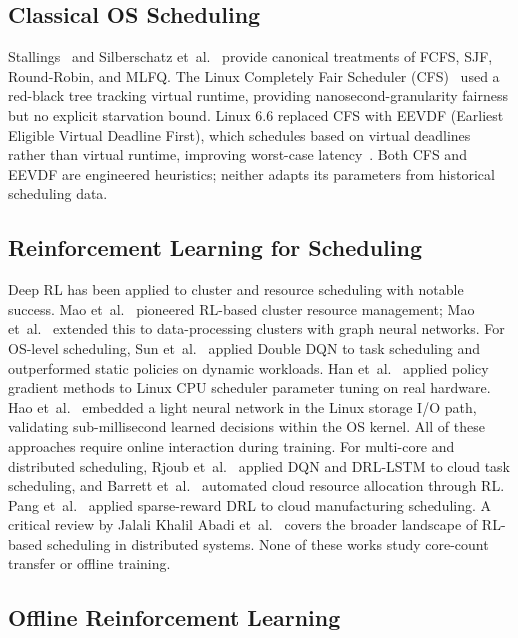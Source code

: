 \documentclass[10pt,journal,compsoc]{IEEEtran}
\begin{document}
\subsection{Classical OS Scheduling}

Stallings~\cite{stallings} and Silberschatz et~al.~\cite{silberschatz}
provide canonical treatments of FCFS, SJF, Round-Robin, and MLFQ.
The Linux Completely Fair Scheduler (CFS)~\cite{silberschatz} used a
red-black tree tracking virtual runtime, providing nanosecond-granularity
fairness but no explicit starvation bound.
Linux 6.6 replaced CFS with EEVDF (Earliest Eligible Virtual Deadline
First), which schedules based on virtual deadlines rather than virtual
runtime, improving worst-case latency~\cite{silberschatz}.
Both CFS and EEVDF are engineered heuristics; neither adapts its
parameters from historical scheduling data.

\subsection{Reinforcement Learning for Scheduling}

Deep RL has been applied to cluster and resource scheduling with notable
success. Mao et~al.~\cite{mao2016} pioneered RL-based cluster resource
management; Mao et~al.~\cite{decima} extended this to data-processing
clusters with graph neural networks.
For OS-level scheduling, Sun et~al.~\cite{sundqn} applied Double DQN to
task scheduling and outperformed static policies on dynamic workloads.
Han et~al.~\cite{hanlearning} applied policy gradient methods to Linux
CPU scheduler parameter tuning on real hardware.
Hao et~al.~\cite{linnos} embedded a light neural network in the Linux
storage I/O path, validating sub-millisecond learned decisions within the
OS kernel.
All of these approaches require online interaction during training.
For multi-core and distributed scheduling, Rjoub et~al.~\cite{rjoubccpe}
applied DQN and DRL-LSTM to cloud task scheduling, and
Barrett et~al.~\cite{barrettccpe} automated cloud resource allocation
through RL.
Pang et~al.~\cite{pangccpe} applied sparse-reward DRL to cloud
manufacturing scheduling.
A critical review by Jalali Khalil Abadi et~al.~\cite{jalali2024} covers
the broader landscape of RL-based scheduling in distributed systems.
None of these works study core-count transfer or offline training.

\subsection{Offline Reinforcement Learning}
\end{document}
